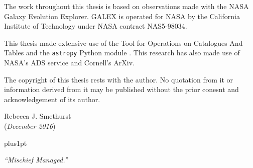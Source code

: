 \documentclass[12pt,useAMS]{ociamthesis}  %
\begin{document}
\begin{originality}
The work throughout this thesis is based on observations made with the NASA Galaxy Evolution Explorer. GALEX is operated for NASA by the California Institute of Technology under NASA contract NAS5-98034. 

This thesis made extensive use of the Tool for Operations on Catalogues And Tables \citep[TOPCAT;][]{taylor05} and the {\tt astropy} Python module \citep{astropy13}. This research has also made use of NASA’s ADS service and Cornell’s ArXiv.

The copyright of this thesis rests with the author. No quotation from it or information derived from it may be published without the prior conesnt and acknowledgement of its author. 

\begin{flushright}
Rebecca J. Smethurst
\\
(\emph{December 2016})
\end{flushright}


\end{originality}

\begin{acknowledgements}


\end{acknowledgements}

\begin{romanpages}          %
\tableofcontents            %
\listoffigures              %
\end{romanpages}            %


\baselineskip=18pt plus1pt
\linespread{1.2}
 \setlength{\parskip}{1em}
 






%




\newpage
\vspace*{3cm}

\begin{center}

\emph{``Mischief Managed.''}
\end{center}
\end{document}
